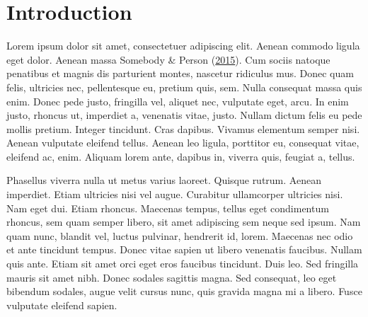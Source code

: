 \documentclass[]{cik}%
\begin{document}

\maketitle

\newpage

\captionsetup[table]{labelformat=empty}
\captionsetup[figure]{labelformat=empty}
\raggedbottom

\hypertarget{introduction}{%
\section{Introduction}\label{introduction}}

Lorem ipsum dolor sit amet, consectetuer adipiscing elit. Aenean commodo
ligula eget dolor. Aenean massa Somebody \& Person
(\protect\hyperlink{ref-CreativeTag1}{2015}). Cum sociis natoque
penatibus et magnis dis parturient montes, nascetur ridiculus mus. Donec
quam felis, ultricies nec, pellentesque eu, pretium quis, sem. Nulla
consequat massa quis enim. Donec pede justo, fringilla vel, aliquet nec,
vulputate eget, arcu. In enim justo, rhoncus ut, imperdiet a, venenatis
vitae, justo. Nullam dictum felis eu pede mollis pretium. Integer
tincidunt. Cras dapibus. Vivamus elementum semper nisi. Aenean vulputate
eleifend tellus. Aenean leo ligula, porttitor eu, consequat vitae,
eleifend ac, enim. Aliquam lorem ante, dapibus in, viverra quis, feugiat
a, tellus.

Phasellus viverra nulla ut metus varius laoreet. Quisque rutrum. Aenean
imperdiet. Etiam ultricies nisi vel augue. Curabitur ullamcorper
ultricies nisi. Nam eget dui. Etiam rhoncus. Maecenas tempus, tellus
eget condimentum rhoncus, sem quam semper libero, sit amet adipiscing
sem neque sed ipsum. Nam quam nunc, blandit vel, luctus pulvinar,
hendrerit id, lorem. Maecenas nec odio et ante tincidunt tempus. Donec
vitae sapien ut libero venenatis faucibus. Nullam quis ante. Etiam sit
amet orci eget eros faucibus tincidunt. Duis leo. Sed fringilla mauris
sit amet nibh. Donec sodales sagittis magna. Sed consequat, leo eget
bibendum sodales, augue velit cursus nunc, quis gravida magna mi a
libero. Fusce vulputate eleifend sapien.
\end{document}
